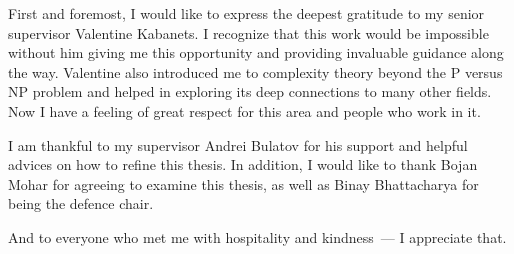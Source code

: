 First and foremost, I would like to express the deepest gratitude
to my senior supervisor Valentine Kabanets.
I recognize that this work would be impossible without him giving me
this opportunity and providing invaluable guidance along the way.
Valentine also introduced me to complexity theory beyond the P versus NP problem
and helped in exploring its deep connections to many other fields.
Now I have a feeling of great respect for this area and people who work in it.

I am thankful to my supervisor Andrei Bulatov for his support
and helpful advices on how to refine this thesis.
In addition, I would like to thank Bojan Mohar for agreeing to examine this thesis,
as well as Binay Bhattacharya for being the defence chair.

And to everyone who met me with hospitality and kindness~--- I appreciate that.

